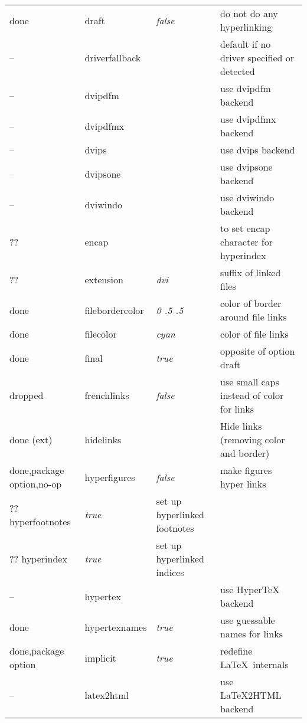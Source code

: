 \begin{longtable}{@{}l>{\ttfamily}llp{7cm}@{}}
done   & draft              & \textit{false}         & do not do any hyperlinking \\
--     & driverfallback     &                        & default if no driver specified or detected\\
--     & dvipdfm            &                        & use \textsf{dvipdfm} backend \\
--     & dvipdfmx           &                        & use \textsf{dvipdfmx} backend \\
--     & dvips              &                        & use \textsf{dvips} backend \\
--     & dvipsone           &                        & use \textsf{dvipsone} backend \\
--     & dviwindo           &                        & use \textsf{dviwindo} backend \\
??   &encap              &                        & to set encap character for hyperindex \\
??   &extension          & \textit{dvi}           & suffix of linked files \\
done &filebordercolor    & \textit{0 .5 .5}       & color of border around file links \\
done &filecolor          & \textit{cyan}          & color of file links \\
done   &final              & \textit{true}          & opposite of option draft \\
dropped &frenchlinks        & \textit{false}         & use small caps instead of color for links \\
done (ext) & hidelinks          &                        & Hide links (removing color and border) \\
done,package option,no-op& hyperfigures       & \textit{false}         & make figures hyper links \\
?? hyperfootnotes     & \textit{true}          & set up hyperlinked footnotes \\
?? hyperindex         & \textit{true}          & set up hyperlinked indices \\
-- & hypertex           &                        & use \textsf{Hyper\TeX} backend \\
done & hypertexnames      & \textit{true}          & use guessable names for links \\
done,package option & implicit           & \textit{true}          & redefine \LaTeX\ internals \\
-- & latex2html         &                        & use \textsf{\LaTeX2HTML} backend \\

\end{longtable}
